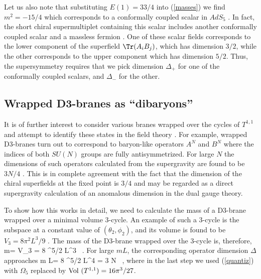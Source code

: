 Let us also note that substituting $E(1)=33/4$ into (\ref{masses}) we find
$m^2=-15/4$ which corresponds to a conformally coupled scalar in $AdS_5$
\cite{Kim}. In fact, the short chiral
supermultiplet containing this scalar includes
another conformally coupled scalar and a massless fermion \cite{Ceres}. 
One of these
scalar fields corresponds to the lower component of the superfield
$\Tr (A_i B_j)$, which has dimension $3/2$, while the other
corresponds to the upper component which has dimension $5/2$. Thus,
the supersymmetry requires that we pick dimension $\Delta_+$ for one
of the conformally coupled scalars, and $\Delta_-$ for the other.



\subsection{Wrapped D3-branes as ``dibaryons''}

It is of further interest to consider various branes wrapped 
over the cycles of $T^{1,1}$ and attempt to 
identify these states in the field theory \cite{GK}.
For example, wrapped
D3-branes turn out to correspond to baryon-like operators $A^N$
and $B^N$ where the indices of both $SU(N)$ groups are fully
antisymmetrized.  For large $N$ the dimensions of such operators
calculated from the supergravity are found to be $3N/4$ \cite{GK}. 
This is in
complete agreement with the fact that the dimension of the chiral
superfields at the fixed point is $3/4$ and may be regarded as a direct
supergravity calculation of an anomalous dimension in the dual gauge
theory.

To show how this works in detail, we need to calculate the mass
of a D3-brane wrapped over a minimal volume 3-cycle.
An example of such a 3-cycle is 
the subspace at a constant value of $(\theta_2, \phi_2)$, and its volume
is found to be $V_3= 8\pi^2 L^3/9$ \cite{GK}.
The mass of the D3-brane
wrapped over the 3-cycle is, therefore,
 \be
m= V_3 {\sqrt\pi\over \kappa} = {8 \pi^{5/2} L^3\kappa}
\ .
\ee
For large $mL$, the corresponding operator dimension 
$\Delta$ approaches
\be 
m L= 
{8 \pi^{5/2} L^4\kappa} = {3} N
\ ,
\ee
where in the last step we used (\ref{quantiz}) with $\Omega_5$
replaced by ${\rm Vol}\ (T^{1,1})= 16 \pi^3/ 27$.

